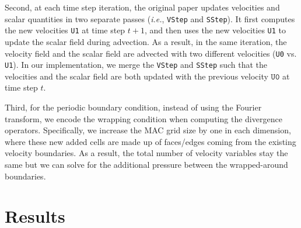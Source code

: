 \documentclass[sigconf]{acmart}
\begin{document}
Second, at each time step iteration, the original paper updates velocities and scalar quantities in two separate passes (\emph{i.e.}, \texttt{VStep} and \texttt{SStep}). It first computes the new velocities \texttt{U1} at time step $t + 1$, and then uses the new velocities \texttt{U1} to update the scalar field during advection. As a result, in the same iteration, the velocity field and the scalar field are advected with two different velocities (\texttt{U0} vs. \texttt{U1}). In our implementation, we merge the \texttt{VStep} and \texttt{SStep} such that the velocities and the scalar field are both updated with the previous velocity $\texttt{U0}$ at time step $t$.

Third, for the periodic boundary condition, instead of using the Fourier transform, we encode the wrapping condition when computing the divergence operators. Specifically, we increase the MAC grid size by one in each dimension, where these new added cells are made up of faces/edges coming from the existing velocity boundaries. As a result, the total number of velocity variables stay the same but we can solve for the additional pressure between the wrapped-around boundaries. 

\section{Results}
\label{sec:result}
\end{document}
